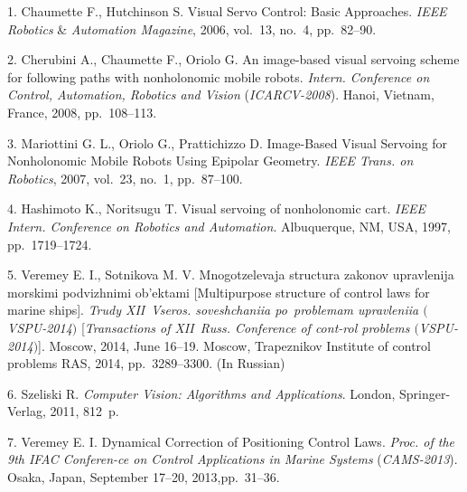 

{\footnotesize

\vskip 2mm


\vskip 1.5mm



{1}. {Chaumette F., Hutchinson S. } Visual Servo Control: Basic
Approaches. {\it  IEEE Robotics}  \& {\it Automation Magazine},
2006, vol.~13, no.~4, pp.~82--90.

{2}. {Cherubini A., Chaumette F., Oriolo G.} An image-based visual
servoing scheme for following paths with nonholonomic mobile
robots. {\it Intern. Conference on Control, Automation, Robotics
and Vision }({\it ICARCV-2008}). Hanoi, Vietnam, France, 2008,
pp.~108--113.

{3}. {Mariottini G. L., Oriolo G., Prattichizzo D.} Image-Based
Visual Servoing for Nonholonomic Mobile Robots Using Epipolar
Geometry. {\it IEEE Trans. on Robotics}, 2007, vol.~23, no.~1,
pp.~87--100.

{4}. {Hashimoto K., Noritsugu T.} Visual servoing of nonholonomic
cart. {\it IEEE Intern. Conference on Robotics and Automation}.
Albuquerque, NM, USA, 1997, pp.~1719--1724.

{5}. {Veremey E. I., Sotnikova M. V.} Mnogotzelevaja structura
zakonov upravlenija morskimi podvizhnimi ob'ektami [Multipurpose
structure of control laws for marine ships]. {\it Trudy
XII~Vseros. soveshchaniia po~problemam upravleniia
$($VSPU-2014$)$} [{\it Transactions of XII~Russ. Conference of
cont-\linebreak rol problems $($VSPU-2014$)$}]. Moscow, 2014, June
16--19. Moscow, Trapeznikov Institute of control problems RAS,
2014, pp.~3289--3300. (In Russian)

{6}. {Szeliski R.} {\it Computer Vision: Algorithms and
Applications}. London, Springer-Verlag, 2011, 812~p.

{7}. {Veremey E. I.} Dynamical Correction of Positioning Control
Laws. {\it Proc. of the 9th IFAC Conferen-\linebreak ce on Control
Applications in Marine Systems }({\it CAMS-2013}). Osaka, Japan,
September 17--20, 2013,\linebreak  pp.~31--36.





}
